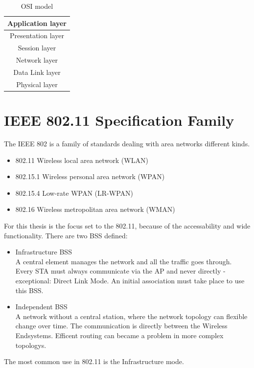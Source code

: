\documentclass[]{ccs-thesis}
\begin{document}
\begin{table}
	\centering
	\begin{tabular}{ |c| } 
		\hline
		Application layer\\
		\hline
		Presentation layer\\
		\hline
		Session layer\\
		\hline
		Network layer\\
		\hline
		\cellcolor{yellow!25}Data Link layer\\
		\hline
		\cellcolor{yellow!25}Physical layer\\
		\hline
	\end{tabular}
	\caption{\ac{OSI} model}
	\label{tab:OsiModel}
\end{table}

\section{IEEE 802.11 Specification Family}

The \ac{IEEE} 802 is a family of standards dealing with area networks different kinds.
\begin{itemize}
	\item 802.11 Wireless local area network (WLAN)
	\item 802.15.1 Wireless personal area network (WPAN)
	\item 802.15.4 Low-rate WPAN (LR-WPAN)
	\item 802.16 Wireless metropolitan area network (WMAN)
\end{itemize}

For this thesis is the focus set to the 802.11, because of the accessability and wide functionality.
There are two \ac{BSS} defined:
\begin{itemize}
	\item Infrastructure BSS\\
	A central element manages the network and all the traffic goes through. 
	Every \ac{STA} must always communicate via the \ac{AP} and never directly - exceptional: Direct Link Mode.
	An initial association must take place to use this \ac{BSS}.
	\item Independent BSS\\
	A network without a central station, where the network topology can flexible change over time.
	The communication is directly between the Wireless Endsystems.
	Efficent routing can became a problem in more complex topologys.
\end{itemize}
The most common use in 802.11 is the Infrastructure mode.\\ 
\end{document}
